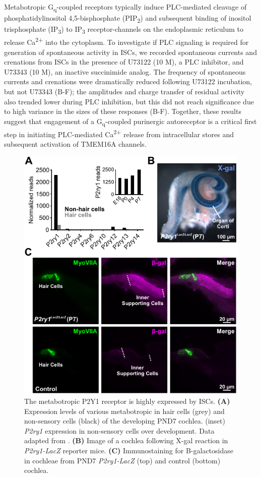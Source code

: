 \documentclass[9pt,lineno]{elife}
\begin{document}
Metabotropic G\textsubscript{q}-coupled receptors typically induce PLC-mediated cleavage of phosphatidylinositol 4,5-bisphosphate (PIP\textsubscript{2}) and subsequent binding of inositol trisphosphate (IP\textsubscript{3}) to IP\textsubscript{3} receptor-channels on the endoplasmic reticulum to release Ca\textsuperscript{2+} into the cytoplasm. To investigate if PLC signaling is required for generation of spontaneous activity in ISCs, we recorded spontaneous currents and crenations from ISCs in the presence of U73122 (10 \textmu M), a PLC inhibitor, and U73343 (10 \textmu M), an inactive succinimide analog. The frequency of spontaneous currents and crenations were dramatically reduced following U73122 incubation, but not U73343 (B-F); the amplitudes and charge transfer of residual activity also trended lower during PLC inhibition, but this did not reach significance due to high variance in the sizes of these responses (B-F). Together, these results suggest that engagement of a G\textsubscript{q}-coupled purinergic autoreceptor is a critical first step in initiating PLC-mediated Ca\textsuperscript{2+} release from intracellular stores and subsequent activation of TMEM16A channels.

\begin{figure}
\includegraphics[width=.63\linewidth]{figures/Fig2.pdf}
\caption{The metabotropic P2Y1 receptor is highly expressed by ISCs.
\textbf{(A)} Expression levels of various metabotropic in hair cells (grey) and non-sensory cells (black) of the developing PND7 cochlea. (inset) \textit{P2ry1} expression in non-sensory cells over development. Data adapted from \cite{Scheffer2015}.
\textbf{(B)} Image of a cochlea following X-gal reaction in \textit{P2ry1-LacZ} reporter mice.
\textbf{(C)} Immunostaining for B-galactosidase in cochleae from PND7 \textit{P2ry1-LacZ} (top) and control (bottom) cochlea.
}
\label{fig:f2}
\end{figure}
\end{document}
